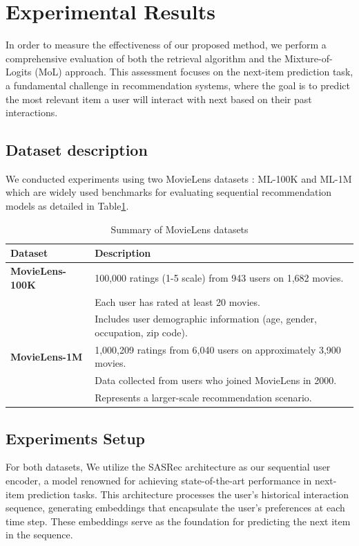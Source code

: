 \documentclass[review]{jair}
\begin{document}
\section{Experimental Results}\label{sec3}
In order to measure the effectiveness of our proposed method, we perform a comprehensive evaluation of both the retrieval algorithm and the Mixture-of-Logits (MoL) approach. This assessment focuses on the next-item prediction task, a fundamental challenge in recommendation systems\cite{Zhu_2018}\cite{kang2018selfattentivesequentialrecommendation}, where the goal is to predict the most relevant item a user will interact with next based on their past interactions. 
\subsection{Dataset description}
We conducted experiments using two MovieLens datasets : ML-100K and ML-1M \cite{Harper2015}which are widely used benchmarks for evaluating sequential recommendation models as detailed in Table\ref{tab:movielens}.\\
\begin{table}[h]
	\centering
	\renewcommand{\arraystretch}{1.2}
	\begin{tabular}{|l|p{10cm}|}
		\hline
		\textbf{Dataset} & \textbf{Description} \\
		\hline
		\textbf{MovieLens-100K} & 100,000 ratings (1-5 scale) from 943 users on 1,682 movies. \\
		& Each user has rated at least 20 movies. \\
		& Includes user demographic information (age, gender, occupation, zip code). \\
		\hline
		\textbf{MovieLens-1M} & 1,000,209 ratings from 6,040 users on approximately 3,900 movies. \\
		& Data collected from users who joined MovieLens in 2000. \\
		& Represents a larger-scale recommendation scenario. \\
		\hline
	\end{tabular}
	\caption{Summary of MovieLens datasets}
	\label{tab:movielens}
\end{table}
\subsection{ Experiments Setup }
For both datasets, We utilize the SASRec architecture as our sequential user encoder, a model renowned for achieving state-of-the-art performance in next-item prediction tasks. This architecture processes the user's historical interaction sequence, generating embeddings that encapsulate the user's preferences at each time step. These embeddings serve as the foundation for predicting the next item in the sequence.
\end{document}
